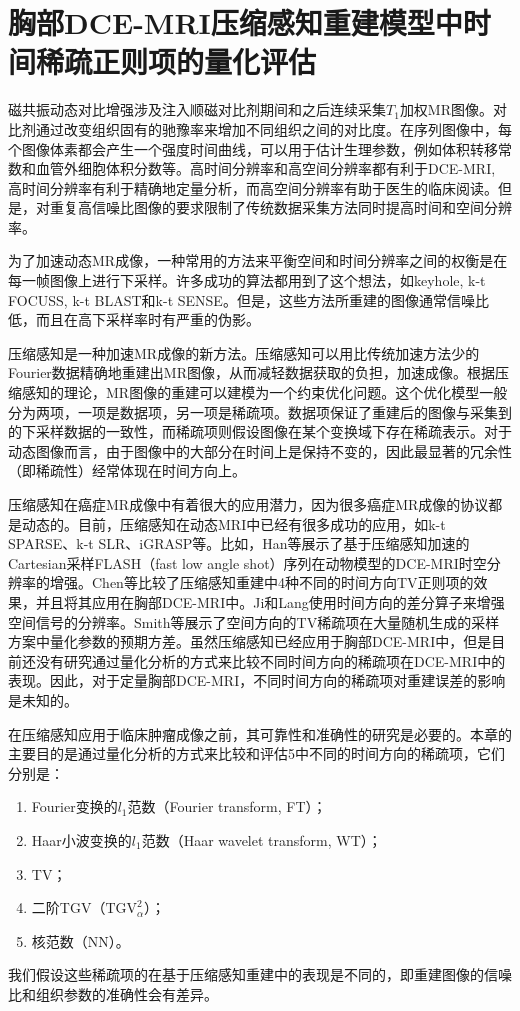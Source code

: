 \chapter{胸部DCE-MRI压缩感知重建模型中时间稀疏正则项的量化评估}
\label{chap:qetsr}
磁共振动态对比增强涉及注入顺磁对比剂期间和之后连续采集$T_1$加权MR图像\cite{Yankeelov2009}。对比剂通过改变组织固有的驰豫率来增加不同组织之间的对比度。在序列图像中，每个图像体素都会产生一个强度时间曲线，可以用于估计生理参数，例如体积转移常数\kt 和血管外细胞体积分数\Ve 等。高时间分辨率和高空间分辨率都有利于DCE-MRI, 高时间分辨率有利于精确地定量分析，而高空间分辨率有助于医生的临床阅读。但是，对重复高信噪比图像的要求限制了传统数据采集方法同时提高时间和空间分辨率。

为了加速动态MR成像，一种常用的方法来平衡空间和时间分辨率之间的权衡是在每一帧图像上进行下采样。许多成功的算法都用到了这个想法，如keyhole\cite{van1993}, k-t FOCUSS\cite{focuss}, k-t BLAST和k-t SENSE\cite{Jeffrey2003k}。但是，这些方法所重建的图像通常信噪比低，而且在高下采样率时有严重的伪影。

压缩感知是一种加速MR成像的新方法\cite{Donoho2006Compressed,Candes2006Robust}。压缩感知可以用比传统加速方法少的Fourier数据精确地重建出MR图像，从而减轻数据获取的负担，加速成像。根据压缩感知的理论，MR图像的重建可以建模为一个约束优化问题。这个优化模型一般分为两项，一项是数据项，另一项是稀疏项。数据项保证了重建后的图像与采集到的下采样数据的一致性，而稀疏项则假设图像在某个变换域下存在稀疏表示。对于动态图像而言，由于图像中的大部分在时间上是保持不变的，因此最显著的冗余性（即稀疏性）经常体现在时间方向上。

压缩感知在癌症MR成像中有着很大的应用潜力\cite{smith2013}，因为很多癌症MR成像的协议都是动态的。目前，压缩感知在动态MRI中已经有很多成功的应用，如k-t SPARSE\cite{lustig2006}、k-t SLR\cite{Sajan2011Accelerated}、iGRASP\cite{igrasp}等。比如，Han等展示了基于压缩感知加速的Cartesian采样FLASH（fast low angle shot）\cite{han}序列在动物模型的DCE-MRI时空分辨率的增强。Chen\cite{chen}等比较了压缩感知重建中4种不同的时间方向TV正则项的效果，并且将其应用在胸部DCE-MRI中。Ji和Lang\cite{ji2008}使用时间方向的差分算子来增强空间信号的分辨率。Smith\cite{smith2011,smith2012}等展示了空间方向的TV稀疏项在大量随机生成的采样方案中量化参数的预期方差。虽然压缩感知已经应用于胸部DCE-MRI中，但是目前还没有研究通过量化分析的方式来比较不同时间方向的稀疏项在DCE-MRI中的表现。因此，对于定量胸部DCE-MRI，不同时间方向的稀疏项对重建误差的影响是未知的。

在压缩感知应用于临床肿瘤成像之前，其可靠性和准确性的研究是必要的。本章的主要目的是通过量化分析的方式来比较和评估5中不同的时间方向的稀疏项，它们分别是：
\begin{enumerate}
	\item Fourier变换的$l_1$范数（Fourier transform, FT）；
	\item Haar小波变换的$l_1$范数（Haar wavelet transform, WT）；
	\item TV；
	\item 二阶TGV（$\textrm{TGV}_{\alpha}^2$）；
	\item 核范数（NN）。
\end{enumerate}
我们假设这些稀疏项的在基于压缩感知重建中的表现是不同的，即重建图像的信噪比和组织参数的准确性会有差异。

